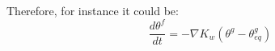 Therefore, for instance it could be:
\begin{equation}
\frac{d \theta^f}{dt} = - {\nabla} K_w ({\theta^g - \theta^g_{eq}})
\end{equation}